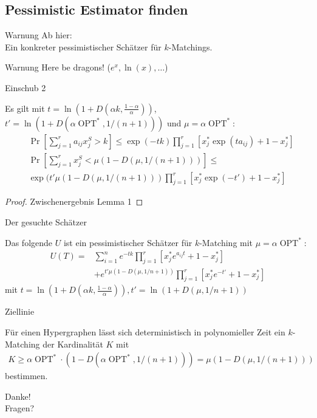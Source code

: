 \documentclass{beamer}
\DeclareMathOperator{\OPT}{OPT}
\begin{document}
\subsection{Pessimistic Estimator finden}
\begin{frame}{Warnung}
  \alert{  Ab hier:\\
    Ein konkreter pessimistischer Schätzer für $k$-Matchings.}
  \begin{block}{Warnung}
    Here be dragons! ($e^{x},\ln(x),\ldots$)
  \end{block}
  
\end{frame}
\begin{frame}{Einschub 2}
  \begin{lemma}[Lemma 3]
    Es gilt mit $t=\ln(1+D(\alpha
    k,\frac{1-\alpha}{\alpha}))$,$t'=\ln(1+D(\alpha \OPT^{*},1/(n+1)))$
    und $\mu=\alpha\OPT^{*}$:
    \begin{align*}
      &\Pr[\sum_{j=1}^{r}a_{ij}x^{S}_{j}>k]\leq \exp(-tk)\prod_{j=1}^{r}[x^{*}_{j}\exp(ta_{ij})+1-x^{*}_{j}]\\
      &\Pr[\sum_{j=1}^{r}x^{S}_{j}<\mu(1-D(\mu,1/(n+1)))]\leq\\
      &\exp(t'\mu(1-D(\mu,1/(n+1)))\prod_{j=1}^{r}[x^{*}_{j}\exp(-t')+1-x^{*}_{j}]
    \end{align*}
  \end{lemma}
  \begin{proof}
    Zwischenergebnis Lemma 1
  \end{proof}
\end{frame}
\begin{frame}{Der gesuchte Schätzer}
  \begin{theorem}
    Das folgende $U$ ist ein pessimistischer Schätzer für $k$-Matching
    mit $\mu=\alpha\OPT^{*}$:
    \begin{align*}
      U(T)=&\sum_{i=1}^{n}e^{-tk}\prod_{j=1}^{r}[x^{*}_{j}e^{a_{ij}t}+1-x^{*}_{j}]\\
      &+e^{t'\mu(1-D(\mu,1/n+1))}\prod_{j=1}^{r}[x_{j}^{*}e^{-t'}+1-x^{*}_{j}]
    \end{align*}
    mit $t=\ln(1+D(\alpha k,\frac{1-\alpha}{\alpha })),t'=\ln(1+D(\mu,1/n+1))$
  \end{theorem}
\end{frame}

\begin{frame}{Ziellinie}
  \begin{theorem}
    Für einen Hypergraphen lässt sich deterministisch in polynomieller
    Zeit ein $k$-Matching der Kardinalität $K$ mit 
    \begin{align*}
      K\geq \alpha \OPT^{*}\cdot (1-D(\alpha \OPT^{*},1/(n+1)))=\mu(1-D(\mu,1/(n+1)))
    \end{align*}
    bestimmen.
  \end{theorem}
\end{frame}


\begin{frame}
  \begin{center}
    \Huge{Danke!}\\
    \small{Fragen?}
  \end{center}
\end{frame}
\end{document}
